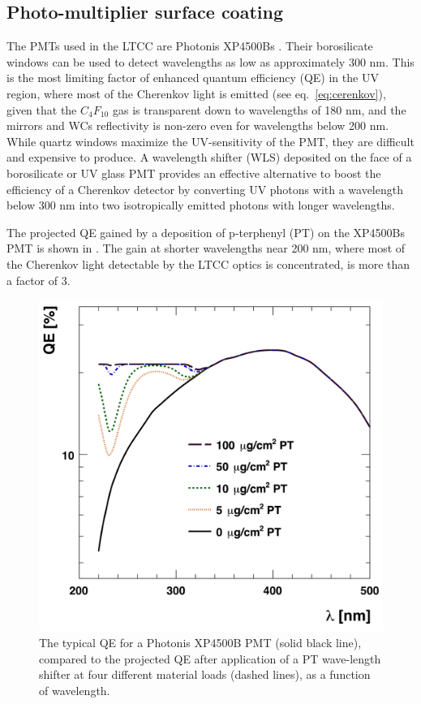 \subsection{Photo-multiplier surface coating}

The PMTs used in the LTCC are Photonis XP4500Bs \cite{Photonis:2007ta}.
Their borosilicate windows can be used to detect wavelengths as low as approximately
300 nm. This is the most limiting factor of enhanced quantum efficiency (QE) in the UV region, where most of the Cherenkov
light is emitted (see eq.~\ref{eq:cerenkov}), given that the $C_4F_{10}$ gas is transparent down to
wavelengths of 180 nm, and the mirrors and WCs reflectivity is non-zero
even for wavelengths below 200 nm.
While quartz windows maximize the UV-sensitivity of the PMT, they are difficult and expensive to produce.
A wavelength shifter (WLS) deposited on the face of a borosilicate or UV glass
PMT provides an effective alternative to boost the efficiency of a Cherenkov
detector by converting UV photons with a wavelength below 300 nm into two
isotropically emitted photons with longer wavelengths.

The projected QE gained by a deposition of p-terphenyl (PT) on the XP4500Bs
PMT \cite{Koczon:1457653} is shown in .
The gain at shorter wavelengths near 200 nm, where most of the Cherenkov light
detectable by the LTCC optics is concentrated, is more than a factor of 3.


\begin{figure}
	\centering
	\includegraphics[width=0.98\columnwidth,keepaspectratio]{img/pmtQuantumEfficiencyGain.png}
	\caption{The typical QE for a Photonis XP4500B PMT (solid black line), compared to the projected QE after application
				of a PT wave-length shifter at four different material loads (dashed lines), as a function of wavelength. }
	\label{fig:pmtQuantumEfficiencyGain}
\end{figure}

